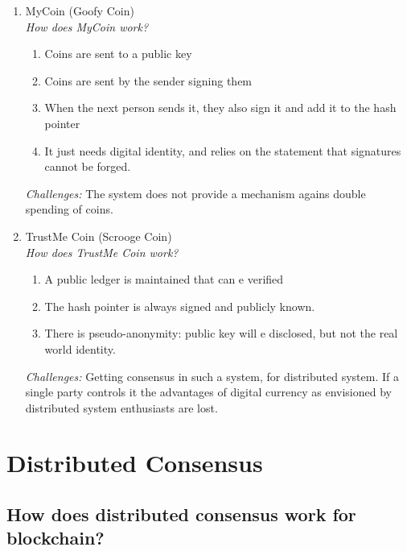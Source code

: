 \documentclass[10pt,a4paper]{article}
\begin{document}
\begin{enumerate}
	\item MyCoin (Goofy Coin)\\
	\emph{How does MyCoin work?}
	\begin{enumerate}
		\item Coins are sent to a public key
		
		\item Coins are sent by the sender signing them
		
		\item When the next person sends it, they also sign it and add it to the hash pointer
		
		\item It just needs digital identity, and relies on the statement that signatures cannot be forged.
	\end{enumerate}
	\emph{Challenges:} The system does not provide a mechanism agains double spending of coins.\\
		
	\item TrustMe Coin (Scrooge Coin)\\
	\emph{How does TrustMe Coin work?}
	\begin{enumerate}
		\item A public ledger is maintained that can e verified
		
		\item The hash pointer is always signed and publicly known.
		
		\item There is pseudo-anonymity: public key will e disclosed, but not the real world identity.
	\end{enumerate}
	\emph{Challenges:} Getting consensus in such a system, for distributed system. If a single party controls it the advantages of digital currency as envisioned by distributed system enthusiasts are lost.
	
\end{enumerate}



\section{Distributed Consensus}



\subsection{How does distributed consensus work for blockchain?}
\end{document}
